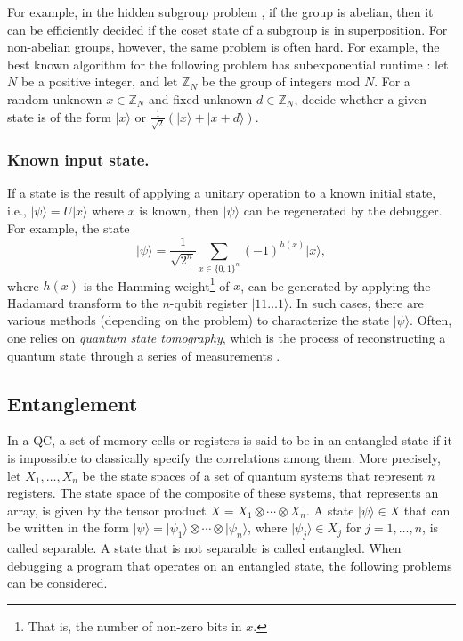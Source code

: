 \documentclass[11pt]{article}
\theoremstyle{plain}
\theoremstyle{definition}
\newcommand{\ldbrac}[1]{\lvert#1\rangle}
\def\Z{\ensuremath{\mathbb{Z}}}
\begin{document}
For example, in the hidden subgroup problem \cite[Chapter 7]{kaye2007introduction}, if the group is 
abelian, then it can be efficiently 
decided if the coset state of a subgroup is in superposition. For non-abelian groups, however, the 
same problem is often hard. For example, 
the best known algorithm for the following problem has subexponential runtime 
\cite{kuperberg2005subexponential}: let $N$ be a positive 
integer, and let $\Z_N$ be the group of integers mod $N$. For a random unknown $x \in \Z_N$ and 
fixed unknown 
$d \in \Z_N$, decide whether a given state is of the form $\ldbrac{x}$ or 
$\frac{1}{\sqrt{2}}(\ldbrac{x} + \ldbrac{x + d})$.

\subsubsection{Known input state.}\label{sec:known-inp}
If a state is the result of applying a unitary operation to a known initial state, i.e., 
$\ldbrac{\psi} = U \ldbrac{x}$ where $x$ is known, then $\ldbrac{\psi}$ can be regenerated by the 
debugger. For example, the state 
\[ \ldbrac{\psi} = \frac{1}{\sqrt{2^n}} \sum_{x \in \{ 0, 1 \}^n} (-1)^{h(x)} \ldbrac{x}, \]
where $h(x)$ is the Hamming weight\footnote{That is, the number of non-zero bits in $x$.} of $x$, 
can be generated by applying the Hadamard transform to the $n$-qubit register $\ldbrac{11 \dots 
1}$. In such cases, there are various methods (depending on 
the problem) to characterize the state $\ldbrac{\psi}$. Often, one relies on \textit{quantum state 
tomography}, which is the process of reconstructing a quantum state through a series of 
measurements \cite{d2003quantum, cramer2010efficient}. 


\subsection{Entanglement}

In a QC, a set of memory cells or registers is said to be in an entangled state if it is impossible 
to classically specify the correlations among them. More precisely, let $X_1, \dots, X_n$ be the 
state spaces of a set of quantum systems that represent $n$ registers. The state space of the 
composite of these systems, that represents an array, is given by the tensor product $X = X_1 
\otimes \cdots \otimes X_n$. A state $\ldbrac{\psi} \in X$ that can be written in the form 
$\ldbrac{\psi} = \ldbrac{\psi_1} \otimes \cdots \otimes \ldbrac{\psi_n}$, where $\ldbrac{\psi_j} 
\in 
X_j$ for $j = 1, \dots, n$, is called separable. A state that is not separable is called entangled. 
When debugging a program that operates on an entangled state, the following problems can be 
considered.
\end{document}
